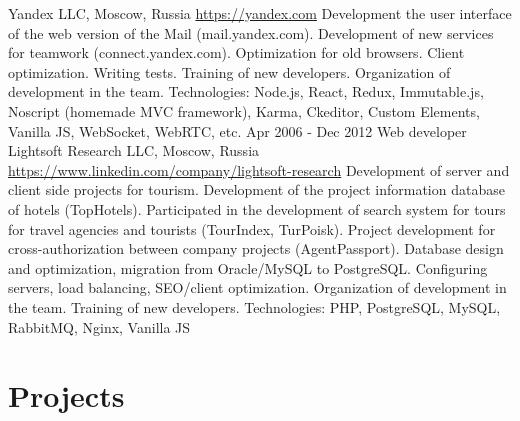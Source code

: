 \documentclass[11pt,a4paper]{moderncv}
\begin{document}
  {Yandex LLC, Moscow, Russia}
  {\newline{}\url{https://yandex.com}}{}
  {Development the user interface of the web version of the Mail (mail.yandex.com).\newline{}
  Development of new services for teamwork (connect.yandex.com).\newline{}
  Optimization for old browsers. Client optimization. Writing tests.\newline{}
  Training of new developers. Organization of development in the team.\newline{}
  Technologies: Node.js, React, Redux, Immutable.js, Noscript (homemade MVC framework), Karma, Ckeditor, Custom Elements, Vanilla JS, WebSocket, WebRTC, etc.}
\cventry
  {Apr 2006 - Dec 2012}
  {Web developer}
  {Lightsoft Research LLC, Moscow, Russia}
  {\newline{}\url{https://www.linkedin.com/company/lightsoft-research}}{}
  {Development of server and client side projects for tourism.\newline{}
  Development of the project information database of hotels (TopHotels).\newline{}
  Participated in the development of search system for tours for travel agencies and tourists (TourIndex, TurPoisk).\newline{}
  Project development for cross-authorization between company projects (AgentPassport).\newline{}
  Database design and optimization, migration from Oracle/MySQL to PostgreSQL. Configuring servers, load balancing, SEO/client optimization.\newline{}
  Organization of development in the team. Training of new developers.\newline{}
  Technologies: PHP, PostgreSQL, MySQL, RabbitMQ, Nginx, Vanilla JS}

\newpage

\section{Projects}
\end{document}
